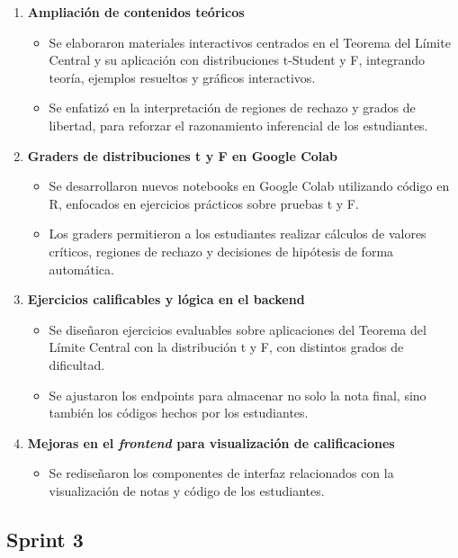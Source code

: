 \documentclass[letter,oneside,12pt,spanish]{report}
\begin{document}
\begin{enumerate}
	\item \textbf{Ampliación de contenidos teóricos}  
	\begin{itemize}
		\item Se elaboraron materiales interactivos centrados en el Teorema del Límite Central y su aplicación con distribuciones t-Student y F, integrando teoría, ejemplos resueltos y gráficos interactivos.
		\item Se enfatizó en la interpretación de regiones de rechazo y grados de libertad, para reforzar el razonamiento inferencial de los estudiantes.
	\end{itemize}
	
	\item \textbf{Graders de distribuciones t y F en Google Colab}  
	\begin{itemize}
		\item Se desarrollaron nuevos notebooks en Google Colab utilizando código en R, enfocados en ejercicios prácticos sobre pruebas t y F.
		\item Los graders permitieron a los estudiantes realizar cálculos de valores críticos, regiones de rechazo y decisiones de hipótesis de forma automática.
	\end{itemize}
	
	\item \textbf{Ejercicios calificables y lógica en el backend}  
	\begin{itemize}
		\item Se diseñaron ejercicios evaluables sobre aplicaciones del Teorema del Límite Central con la distribución t y F, con distintos grados de dificultad.
		\item Se ajustaron los endpoints para almacenar no solo la nota final, sino también los códigos hechos por los estudiantes.
	\end{itemize}
	
	\item \textbf{Mejoras en el \textit{frontend} para visualización de calificaciones}  
	\begin{itemize}
		\item Se rediseñaron los componentes de interfaz relacionados con la visualización de notas y código de los estudiantes.
	\end{itemize}
\end{enumerate}

\subsection{Sprint 3}
\end{document}
